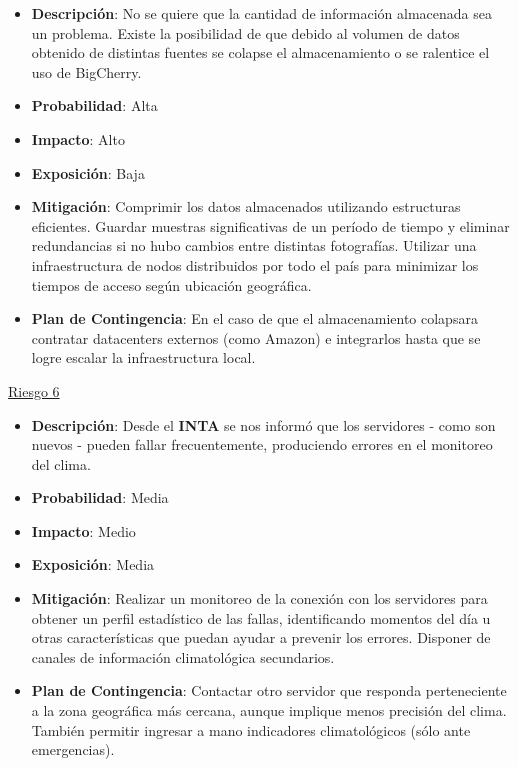 \begin{itemize} \itemsep -2pt
    \item \textbf{Descripción}: No se quiere que la cantidad de información almacenada sea un problema. Existe la posibilidad de que debido al volumen de datos obtenido de distintas fuentes se colapse el almacenamiento o se ralentice el uso de BigCherry.
    \item \textbf{Probabilidad}: Alta
    \item \textbf{Impacto}: Alto	
    \item \textbf{Exposición}: Baja
    \item \textbf{Mitigación}: Comprimir los datos almacenados utilizando estructuras eficientes. Guardar muestras significativas de un período de tiempo y eliminar redundancias si no hubo cambios entre distintas fotografías. Utilizar una infraestructura de nodos distribuidos por todo el país para minimizar los tiempos de acceso según ubicación geográfica.
    \item \textbf{Plan de Contingencia}: En el caso de que el almacenamiento colapsara contratar datacenters externos (como Amazon) e integrarlos hasta que se logre escalar la infraestructura local.
\end{itemize}

\underline{Riesgo 6}

\begin{itemize} \itemsep -2pt
    \item \textbf{Descripción}: Desde el \textbf{INTA} se nos informó que los servidores - como son nuevos - pueden fallar frecuentemente, produciendo errores en el monitoreo del clima.
    \item \textbf{Probabilidad}: Media
    \item \textbf{Impacto}: Medio
    \item \textbf{Exposición}: Media
    \item \textbf{Mitigación}: Realizar un monitoreo de la conexión con los servidores para obtener un perfil estadístico de las fallas, identificando momentos del día u otras características que puedan ayudar a prevenir los errores. Disponer de canales de información climatológica secundarios.
    \item \textbf{Plan de Contingencia}: Contactar otro servidor que responda perteneciente a la zona geográfica más cercana, aunque implique menos precisión del clima. También permitir ingresar a mano indicadores climatológicos (sólo ante emergencias).
\end{itemize}
 

